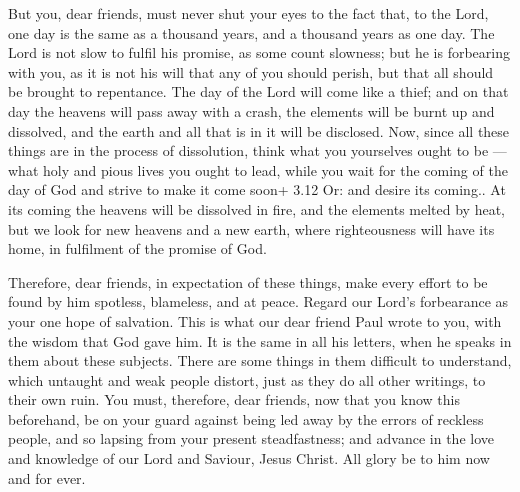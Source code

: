  But you, dear friends, must never shut your eyes to the
fact that, to the Lord, one day is the same as a thousand years, and a
thousand years as one day.  The Lord is not slow to fulfil
his promise, as some count slowness; but he is forbearing with you, as
it is not his will that any of you should perish, but that all should be
brought to repentance.  The day of the Lord will come like
a thief; and on that day the heavens will pass away with a crash, the
elements will be burnt up and dissolved, and the earth and all that is
in it will be disclosed.  Now, since all these things are
in the process of dissolution, think what you yourselves ought to be ---
what holy and pious lives you ought to lead,  while you
wait for the coming of the day of God and strive to make it come soon+
3.12 Or: and desire its coming.. At its coming the heavens will be
dissolved in fire, and the elements melted by heat,  but we
look for new heavens and a new earth, where righteousness will have its
home, in fulfilment of the promise of God.

 Therefore, dear friends, in expectation of these things,
make every effort to be found by him spotless, blameless, and at peace.
 Regard our Lord's forbearance as your one hope of
salvation. This is what our dear friend Paul wrote to you, with the
wisdom that God gave him.  It is the same in all his
letters, when he speaks in them about these subjects. There are some
things in them difficult to understand, which untaught and weak people
distort, just as they do all other writings, to their own ruin.
 You must, therefore, dear friends, now that you know this
beforehand, be on your guard against being led away by the errors of
reckless people, and so lapsing from your present steadfastness;
 and advance in the love and knowledge of our Lord and
Saviour, Jesus Christ. All glory be to him now and for ever.
